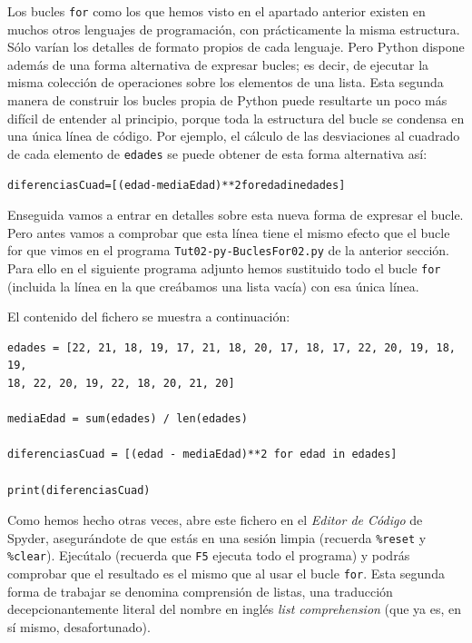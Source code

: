 \documentclass[10pt,a4paper]{article}\usepackage[]{graphicx}\usepackage[]{color}
\makeatletter
\newenvironment{kframe}{%
 \def\at@end@of@kframe{}%
 \ifinner\ifhmode%
  \def\at@end@of@kframe{\end{minipage}}%
  \begin{minipage}{\columnwidth}%
 \fi\fi%
 \def\FrameCommand##1{\hskip\@totalleftmargin \hskip-\fboxsep
 \colorbox{shadecolor}{##1}\hskip-\fboxsep
     \hskip-\linewidth \hskip-\@totalleftmargin \hskip\columnwidth}%
 \MakeFramed {\advance\hsize-\width
   \@totalleftmargin\z@ \linewidth\hsize
   \@setminipage}}%
 {\par\unskip\endMakeFramed%
 \at@end@of@kframe}
\newenvironment{knitrout}{}{} %
\newcounter {cont01}
\makeatother
\begin{document}
Los bucles {\tt for} como los que hemos visto en el apartado anterior existen en muchos otros lenguajes de programación, con prácticamente la misma estructura. Sólo varían los detalles de formato propios de cada lenguaje. Pero Python dispone además de una forma alternativa de expresar bucles; es decir, de ejecutar la misma colección de operaciones sobre los elementos de una lista. Esta segunda manera de construir los bucles propia de Python puede resultarte un poco más difícil de entender al principio, porque toda la estructura del bucle se condensa en una única línea de código. Por ejemplo, el cálculo de las desviaciones al cuadrado de cada elemento de {\tt edades} se puede obtener de esta forma alternativa así:
\begin{knitrout}
\color{fgcolor}\begin{kframe}
\begin{alltt}
diferenciasCuad = [(edad - mediaEdad)**2 for edad in edades]
\end{alltt}
\end{kframe}
\end{knitrout}
Enseguida vamos a entrar en detalles sobre esta nueva forma de expresar el bucle. Pero antes vamos a comprobar que esta línea tiene el mismo efecto que el bucle for que vimos en el programa {\tt Tut02-py-BuclesFor02.py} de la anterior sección. Para ello en el siguiente programa adjunto hemos sustituido todo el bucle {\tt for} (incluida la línea en la que creábamos una lista vacía) con esa única línea. 


\begin{center}
\end{center}
El contenido del fichero se muestra a continuación:
\begin{knitrout}
\color{fgcolor}\begin{kframe}
\begin{verbatim}
edades = [22, 21, 18, 19, 17, 21, 18, 20, 17, 18, 17, 22, 20, 19, 18, 19,
18, 22, 20, 19, 22, 18, 20, 21, 20]

mediaEdad = sum(edades) / len(edades)

diferenciasCuad = [(edad - mediaEdad)**2 for edad in edades]

print(diferenciasCuad)
\end{verbatim}
\end{kframe}
\end{knitrout}
Como hemos hecho otras veces, abre este fichero en el {\em Editor de Código} de Spyder, asegurándote de que estás en una sesión limpia  (recuerda
\verb&%reset&
y \verb&%clear&).
Ejecútalo (recuerda que {\tt F5} ejecuta todo el programa) y podrás comprobar que el resultado es el mismo que al  usar el bucle {\tt for}. Esta segunda forma de trabajar se denomina {\sf comprensión de listas}, una traducción decepcionantemente literal del nombre en inglés {\em list comprehension} (que ya es, en sí mismo, desafortunado).
\end{document}

